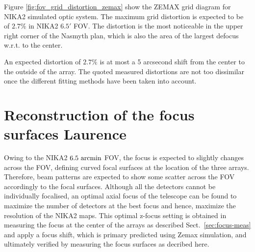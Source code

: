 Figure \ref{fig:fov_grid_distortion_zemax} show the ZEMAX grid diagram for
NIKA2 simulated optic system. The maximum grid distortion is expected
to be of $2.7\%$ in NIKA2 $6.5'$ FOV. The distortion is the most
noticeable in the upper right corner of the Nasmyth plan, which is
also the area of the largest defocus w.r.t. to the center. 

An expected distortion of $2.7\%$ is at most a 5 arcsecond shift from the
center to the outside of the array.  The quoted measured distortions are not
too dissimilar once the different fitting methods have been taken into
account.



\section{Reconstruction of the focus surfaces {\color{blue} Laurence} }
\label{sec:focus_surfaces}

Owing to the NIKA2 $6.5~\rm{arcmin}$ FOV, the focus is expected to
slightly changes across the FOV, defining curved focal surfaces at the
location of the three arrays. Therefore, beam patterns are expected to
show some scatter across the FOV accordingly to the focal
surfaces. Although all the detectors cannot be individually focalised,
an optimal axial focus of the telescope can be found to maximize the
number of detectors at the best focus and hence, maximize the
resolution of the NIKA2 maps.
This optimal z-focus setting is obtained
in measuring the focus at the center of the arrays as described
Sect.~\ref{sec:focus-meas} and apply a focus shift, which is primary
predicted using Zemax simulation, and ultimately verified by measuring
the focus surfaces as decribed here.


